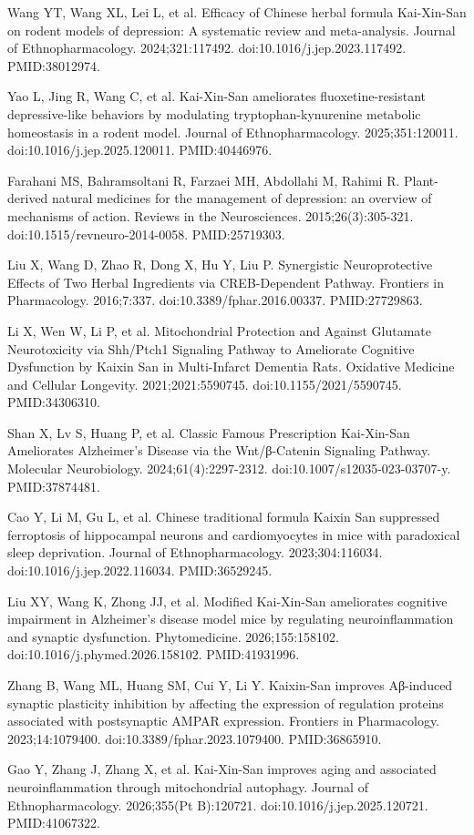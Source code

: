 \documentclass[11pt,oneside]{book}
\newcommand{\refend}{\endgroup\par}
\newcommand{\reff}[2]{\par\hangindent=7mm\hangafter=1\noindent[#1]\hspace{2mm}#2\par}
\begin{document}
\reff{53}{Wang YT, Wang XL, Lei L, et al. Efficacy of Chinese herbal formula Kai-Xin-San on rodent models of depression: A systematic review and meta-analysis. Journal of Ethnopharmacology. 2024;321:117492. doi:10.1016/j.jep.2023.117492. PMID:38012974.}
\reff{54}{Yao L, Jing R, Wang C, et al. Kai-Xin-San ameliorates fluoxetine-resistant depressive-like behaviors by modulating tryptophan-kynurenine metabolic homeostasis in a rodent model. Journal of Ethnopharmacology. 2025;351:120011. doi:10.1016/j.jep.2025.120011. PMID:40446976.}
\reff{55}{Farahani MS, Bahramsoltani R, Farzaei MH, Abdollahi M, Rahimi R. Plant-derived natural medicines for the management of depression: an overview of mechanisms of action. Reviews in the Neurosciences. 2015;26(3):305-321. doi:10.1515/revneuro-2014-0058. PMID:25719303.}
\reff{56}{Liu X, Wang D, Zhao R, Dong X, Hu Y, Liu P. Synergistic Neuroprotective Effects of Two Herbal Ingredients via CREB-Dependent Pathway. Frontiers in Pharmacology. 2016;7:337. doi:10.3389/fphar.2016.00337. PMID:27729863.}
\reff{57}{Li X, Wen W, Li P, et al. Mitochondrial Protection and Against Glutamate Neurotoxicity via Shh/Ptch1 Signaling Pathway to Ameliorate Cognitive Dysfunction by Kaixin San in Multi-Infarct Dementia Rats. Oxidative Medicine and Cellular Longevity. 2021;2021:5590745. doi:10.1155/2021/5590745. PMID:34306310.}
\reff{58}{Shan X, Lv S, Huang P, et al. Classic Famous Prescription Kai-Xin-San Ameliorates Alzheimer's Disease via the Wnt/β-Catenin Signaling Pathway. Molecular Neurobiology. 2024;61(4):2297-2312. doi:10.1007/s12035-023-03707-y. PMID:37874481.}
\reff{59}{Cao Y, Li M, Gu L, et al. Chinese traditional formula Kaixin San suppressed ferroptosis of hippocampal neurons and cardiomyocytes in mice with paradoxical sleep deprivation. Journal of Ethnopharmacology. 2023;304:116034. doi:10.1016/j.jep.2022.116034. PMID:36529245.}
\reff{60}{Liu XY, Wang K, Zhong JJ, et al. Modified Kai-Xin-San ameliorates cognitive impairment in Alzheimer's disease model mice by regulating neuroinflammation and synaptic dysfunction. Phytomedicine. 2026;155:158102. doi:10.1016/j.phymed.2026.158102. PMID:41931996.}
\reff{61}{Zhang B, Wang ML, Huang SM, Cui Y, Li Y. Kaixin-San improves Aβ-induced synaptic plasticity inhibition by affecting the expression of regulation proteins associated with postsynaptic AMPAR expression. Frontiers in Pharmacology. 2023;14:1079400. doi:10.3389/fphar.2023.1079400. PMID:36865910.}
\reff{62}{Gao Y, Zhang J, Zhang X, et al. Kai-Xin-San improves aging and associated neuroinflammation through mitochondrial autophagy. Journal of Ethnopharmacology. 2026;355(Pt B):120721. doi:10.1016/j.jep.2025.120721. PMID:41067322.}
\refend
\end{document}
